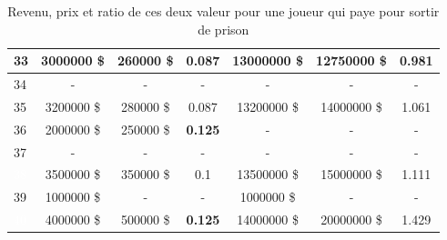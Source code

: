 \documentclass[letterpaper]{article}
\begin{document}
\begin{table}[htbp!]
\begin{tabular}{|l|c|c|c||c|c|c|}
	  \cellcolor[HTML]{2E8B57} 33 & 3000000 \$ & 260000 \$ & 0.087 & 13000000 \$ & 12750000 \$ & 0.981 \\ \hline
	  \cellcolor[HTML]{EEEED1} 34 & - & - & - & - & - & - \\ \hline
	  \cellcolor[HTML]{2E8B57} 35 & 3200000 \$ & 280000 \$ & 0.087 & 13200000 \$ & 14000000 \$ & 1.061 \\ \hline
	  \cellcolor[HTML]{E6E6FA} 36 & 2000000 \$ & 250000 \$ & \textbf{0.125} & - & - & - \\ \hline
	  \cellcolor[HTML]{FFC1C1} 37  & - & - & - & - & - & - \\ \hline
	  \cellcolor[HTML]{483D8B} \textcolor{white}{38} & 3500000 \$ & 350000 \$ & 0.1 & 13500000 \$ & 15000000 \$ & 1.111 \\ \hline
	  \cellcolor[HTML]{8B1A1A} 39  & 1000000 \$ & - & - & 1000000 \$ & - & - \\ \hline
	  \cellcolor[HTML]{483D8B} \textcolor{white}{40} & 4000000 \$ & 500000 \$ & \textbf{0.125} & 14000000 \$ & 20000000 \$ & 1.429 \\ \hline
	\end{tabular}

	\caption{Revenu, prix et ratio de ces deux valeur pour une joueur qui paye pour sortir de prison}
	\label{table:rentabilite_paye}
      \end{table}
\end{document}
